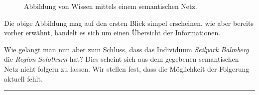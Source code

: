 \begin{figure}[H]
\centering {}
\caption{Abbildung von Wissen mittels einem semantischen Netz.\label{fig:semantischesNetz}\protect\footnotemark}
\end{figure}

Die obige Abbildung mag auf den ersten Blick simpel erscheinen, wie aber bereits vorher erwähnt, handelt es sich um einen Übersicht der Informationen. 

Wie gelangt man nun aber zum Schluss, dass das Individuum \textit{Seilpark Balmberg} die \textit{Region} \textit{Solothurn} hat? Dies scheint sich aus dem gegebenen semantischen Netz nicht folgern zu lassen. Wir stellen fest, dass die Möglichkeit der Folgerung aktuell fehlt.

\vspace{0.1pt}
\noindent\rule[1ex]{\textwidth}{1pt}

